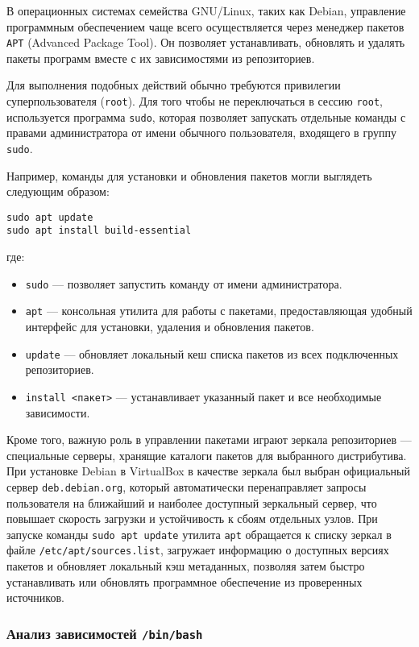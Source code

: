 В операционных системах семейства GNU/Linux, таких как Debian, управление программным обеспечением чаще всего осуществляется через менеджер пакетов \texttt{APT} (Advanced Package Tool). Он позволяет устанавливать, обновлять и удалять пакеты программ вместе с их зависимостями из репозиториев.

Для выполнения подобных действий обычно требуются привилегии суперпользователя (\texttt{root}). Для того чтобы не переключаться в сессию \texttt{root}, используется программа \texttt{sudo}, которая позволяет запускать отдельные команды с правами администратора от имени обычного пользователя, входящего в группу \texttt{sudo}.

Например, команды для установки и обновления пакетов могли выглядеть следующим образом:
\begin{verbatim}
sudo apt update
sudo apt install build-essential
\end{verbatim}
где:
\begin{itemize}
    \item \texttt{sudo} --- позволяет запустить команду от имени администратора.
    \item \texttt{apt} --- консольная утилита для работы с пакетами, предоставляющая удобный интерфейс для установки, удаления и обновления пакетов.
    \item \texttt{update} --- обновляет локальный кеш списка пакетов из всех подключенных репозиториев.
    \item \texttt{install <пакет>} --- устанавливает указанный пакет и все необходимые зависимости.
\end{itemize}

Кроме того, важную роль в управлении пакетами играют зеркала репозиториев — специальные серверы, хранящие каталоги пакетов для выбранного дистрибутива. При установке Debian в VirtualBox в качестве зеркала был выбран официальный сервер \texttt{deb.debian.org}, который автоматически перенаправляет запросы пользователя на ближайший и наиболее доступный зеркальный сервер, что повышает скорость загрузки и устойчивость к сбоям отдельных узлов. При запуске команды \texttt{sudo apt update} утилита \texttt{apt} обращается к списку зеркал в файле \texttt{/etc/apt/sources.list}, загружает информацию о доступных версиях пакетов и обновляет локальный кэш метаданных, позволяя затем быстро устанавливать или обновлять программное обеспечение из проверенных источников.

\subsubsection{Анализ зависимостей \texttt{/bin/bash}}

